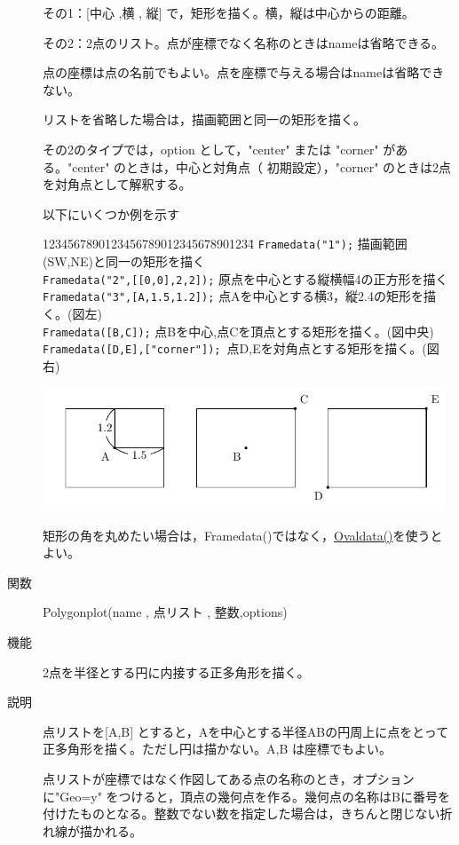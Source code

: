 \documentclass[papersize,a4paper,12pt,uplatex]{jsarticle}
\begin{document}
\begin{description}
その1：[中心 ,横 , 縦] で，矩形を描く。横，縦は中心からの距離。

その2：2点のリスト。点が座標でなく名称のときはnameは省略できる。

点の座標は点の名前でもよい。点を座標で与える場合はnameは省略できない。

リストを省略した場合は，描画範囲と同一の矩形を描く。

その2のタイプでは，option として，"center" または "corner" がある。"center" のときは，中心と対角点（ 初期設定），"corner" のときは2点を対角点として解釈する。 

以下にいくつか例を示す
\begin{tabbing}
1234567890123456789012345678901234\=\kill
\verb|Framedata("1");|\> 描画範囲(SW,NE)と同一の矩形を描く\\
\verb|Framedata("2",[[0,0],2,2]);| \> 原点を中心とする縦横幅4の正方形を描く\\
\verb|Framedata("3",[A,1.5,1.2]);|\> 点Aを中心とする横3，縦2.4の矩形を描く。(図左)\\
\verb|Framedata([B,C]);|\> 点Bを中心,点Cを頂点とする矩形を描く。(図中央)\\
\verb|Framedata([D,E],["corner"]); |\>点D,Eを対角点とする矩形を描く。(図右)
 \end{tabbing}
\begin{center}\includegraphics[bb=0.00 0.00 348.15 106.16,width=12cm]{Fig/Framedata.pdf}\end{center}

矩形の角を丸めたい場合は，Framedata()ではなく，\hyperlink{ovaldata}{Ovaldata()}を使うとよい。
 
\vspace{\baselineskip}
\hypertarget{polygonplot}{}
\item[関数]Polygonplot(name , 点リスト , 整数,options)
\item[機能]2点を半径とする円に内接する正多角形を描く。
\item[説明]点リストを[A,B] とすると，Aを中心とする半径ABの円周上に点をとって正多角形を描く。ただし円は描かない。A,B は座標でもよい。

点リストが座標ではなく作図してある点の名称のとき，オプションに"Geo=y" をつけると，頂点の幾何点を作る。幾何点の名称はBに番号を付けたものとなる。整数でない数を指定した場合は，きちんと閉じない折れ線が描かれる。


\end{description}
\end{document}
